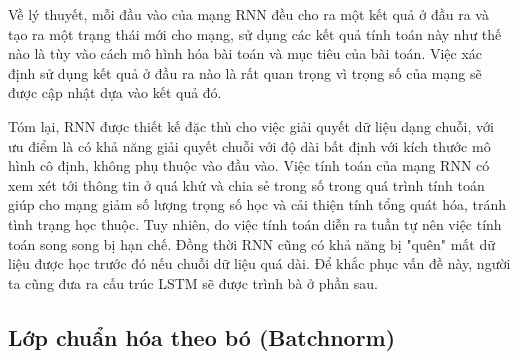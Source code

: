 Về lý thuyết, mỗi đầu vào của mạng RNN đều cho ra một kết quả ở đầu ra và tạo ra một trạng thái mới cho mạng, sử dụng các kết quả tính toán này như thế nào là tùy vào cách mô hình hóa bài toán và mục tiêu của bài toán. Việc xác định sử dụng kết quả ở đầu ra nào là rất quan trọng vì trọng số của mạng sẽ được cập nhật dựa vào kết quả đó.

Tóm lại, RNN được thiết kế đặc thù cho việc giải quyết dữ liệu dạng chuỗi, với ưu điểm là có khả năng giải quyết chuỗi với độ dài bất định với kích thước mô hình cô định, không phụ thuộc vào đầu vào. Việc tính toán của mạng RNN có xem xét tới thông tin ở quá khứ và chia sẻ trong số trong quá trình tính toán giúp cho mạng giảm số lượng trọng số học và cải thiện tính tổng quát hóa, tránh tình trạng học thuộc. Tuy nhiên, do việc tính toán diễn ra tuần tự nên việc tính toán song song bị hạn chế. Đồng thời RNN cũng có khả năng bị "quên" mất dữ liệu được học trước đó nếu chuỗi dữ liệu quá dài. Để khắc phục vấn đề này, người ta cũng đưa ra cấu trúc LSTM sẽ được trình bà ở phần sau.




\subsection{Lớp chuẩn hóa theo bó (Batchnorm)}

